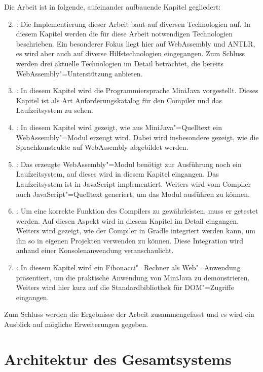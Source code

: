 Die Arbeit ist in folgende, aufeinander aufbauende Kapitel gegliedert:
\begin{enumerate}
    \setcounter{enumi}{1}
    \item \emph{:} Die Implementierung dieser Arbeit baut auf diversen Technologien auf. In diesem Kapitel werden die für diese Arbeit notwendigen Technologien beschrieben. Ein besonderer Fokus liegt hier auf WebAssembly und ANTLR, es wird aber auch auf diverse Hilfstechnologien eingegangen. Zum Schluss werden drei aktuelle Technologien im Detail betrachtet, die bereits WebAssembly"=Unterstützung anbieten.
    \item \emph{:} In diesem Kapitel wird die Programmiersprache MiniJava vorgestellt. Dieses Kapitel ist als Art Anforderungskatalog für den Compiler und das Laufzeitsystem zu sehen.
    \item \emph{:} In diesem Kapitel wird gezeigt, wie aus MiniJava"=Quelltext ein WebAssembly"=Modul erzeugt wird. Dabei wird insbesondere gezeigt, wie die Sprachkonstrukte auf WebAssembly abgebildet werden. 
    \item \emph{:} Das erzeugte WebAssembly"=Modul benötigt zur Ausführung noch ein Laufzeitsystem, auf dieses wird in diesem Kapitel eingangen. Das Laufzeitsystem ist in JavaScript implementiert. Weiters wird vom Compiler auch JavaScript"=Quelltext generiert, um das Modul ausführen zu können.
    \item \emph{:} Um eine korrekte Funktion des Compilers zu gewährleisten, muss er getestet werden. Auf diesen Aspekt wird in diesem Kapitel im Detail eingangen. Weiters wird gezeigt, wie der Compiler in Gradle integriert werden kann, um ihn so in eigenen Projekten verwenden zu können. Diese Integration wird anhand einer Konsolenanwendung veranschaulicht.
    \item \emph{:} In diesem Kapitel wird ein Fibonacci"=Rechner als Web"=Anwendung präsentiert, um die praktische Anwendung von MiniJava zu demonstrieren. Weiters wird hier kurz auf die Standardbibliothek für DOM"=Zugriffe eingangen.
\end{enumerate}

Zum Schluss werden die Ergebnisse der Arbeit zusammengefasst und es wird ein Ausblick auf mögliche Erweiterungen gegeben.

\pagebreak
\section{Architektur des Gesamtsystems}

